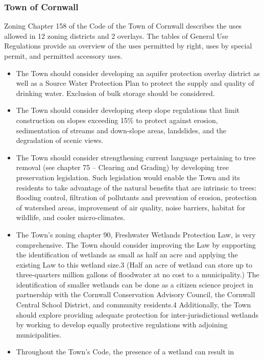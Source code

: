 \subsubsection{Town of Cornwall}
Zoning Chapter 158 of the Code of the Town of Cornwall describes the uses 
allowed in 12 zoning districts and 2 overlays. The tables of General Use 
Regulations provide an overview of the uses permitted by right, uses by special 
permit, and permitted accessory uses.
\begin{itemize}
    \item The Town should consider developing an aquifer protection overlay 
    district as well as a Source Water Protection Plan to protect the supply 
    and quality of drinking water.  Exclusion of bulk storage should be 
    considered.
    \item The Town should consider developing steep slope regulations that limit 
    construction on slopes exceeding 15\% to protect against erosion, 
    sedimentation of streams and down-slope areas, landslides, and the 
    degradation of scenic views.
    \item The Town should consider strengthening current language pertaining 
    to tree removal (see chapter 75 – Clearing and Grading) by developing tree 
    preservation legislation. Such legislation would enable the Town and its 
    residents to take advantage of the natural benefits that are intrinsic to 
    trees: 
    flooding control, filtration of pollutants and prevention of erosion, 
    protection of watershed areas, improvement of air quality, noise barriers, 
    habitat for wildlife, and cooler micro-climates.
    \item The Town’s zoning chapter 90, Freshwater Wetlands Protection Law, is 
    very comprehensive. The Town should consider improving the Law by supporting 
    the identification of wetlands as small as half an acre and applying the 
    existing Law to this wetland size.3 (Half an acre of wetland can store up 
    to three-quarters million gallons of floodwater at no cost to a 
    municipality.) The identification of smaller wetlands can be done as a 
    citizen science project in partnership with the Cornwall Conservation 
    Advisory Council, the Cornwall Central School District, and community 
    residents.4 Additionally, the Town should explore providing adequate 
    protection for inter-jurisdictional wetlands by working to develop equally 
    protective regulations with adjoining municipalities.
    \item Throughout the Town’s Code, the presence of a wetland can result in 

\end{itemize}
